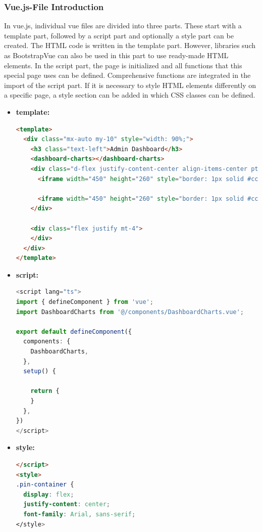 \subsubsection{Vue.js-File Introduction}
In vue.js, individual vue files are divided into three parts. These start with a template part, followed by a script part and optionally a style part can be created.
The HTML code is written in the template part. However, libraries such as BootstrapVue can also be used in this part to use ready-made HTML elements. In the script part, the page is initialized and all functions that this special page uses can be defined. Comprehensive functions are integrated in the import of the script part. If it is necessary to style HTML elements differently on a specific page, a style section can be added in which CSS classes can be defined.
\begin{itemize}
\item \textbf{template:}
\begin{lstlisting}[language=HTML]
<template>
  <div class="mx-auto my-10" style="width: 90%;">
    <h3 class="text-left">Admin Dashboard</h3>
    <dashboard-charts></dashboard-charts>
    <div class="d-flex justify-content-center align-items-center pt-10">
      <iframe width="450" height="260" style="border: 1px solid #cccccc;" src="https://thingspeak.com/channels/2530450/widgets/852176"></iframe>

      <iframe width="450" height="260" style="border: 1px solid #cccccc;" src="https://thingspeak.com/channels/2530450/charts/1?bgcolor=%23ffffff&color=%23d62020&dynamic=true&results=60&title=History+of+Wattage&type=line"></iframe>
    </div>

    <div class="flex justify mt-4">
    </div>
  </div>
</template>
    \end{lstlisting}

\item \textbf{script:}
\begin{lstlisting}[language=TypeScript]
<script lang="ts">
import { defineComponent } from 'vue';
import DashboardCharts from '@/components/DashboardCharts.vue';

export default defineComponent({
  components: {
    DashboardCharts,
  },
  setup() {

    return {
    }
  },
})
</script>
    \end{lstlisting}
\item \textbf{style:}
\begin{lstlisting}[language=HTML]
</script>
<style>
.pin-container {
  display: flex;
  justify-content: center;
  font-family: Arial, sans-serif;
</style>
    \end{lstlisting}
\end{itemize}

